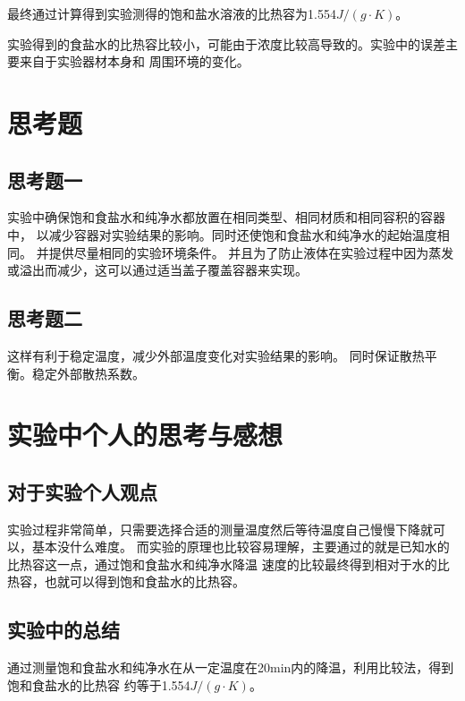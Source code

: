 \documentclass{ctexart}
\begin{document}
最终通过计算得到实验测得的饱和盐水溶液的比热容为1.554$J / (g \cdot K)$。

实验得到的食盐水的比热容比较小，可能由于浓度比较高导致的。实验中的误差主要来自于实验器材本身和
周围环境的变化。


\section{思考题}
  \subsection{思考题一}
  实验中确保饱和食盐水和纯净水都放置在相同类型、相同材质和相同容积的容器中，
  以减少容器对实验结果的影响。同时还使饱和食盐水和纯净水的起始温度相同。
  并提供尽量相同的实验环境条件。
  并且为了防止液体在实验过程中因为蒸发或溢出而减少，这可以通过适当盖子覆盖容器来实现。

  \subsection{思考题二}
  这样有利于稳定温度，减少外部温度变化对实验结果的影响。
  同时保证散热平衡。稳定外部散热系数。

\section{实验中个人的思考与感想}
  \subsection{对于实验个人观点}
  实验过程非常简单，只需要选择合适的测量温度然后等待温度自己慢慢下降就可以，基本没什么难度。
  而实验的原理也比较容易理解，主要通过的就是已知水的比热容这一点，通过饱和食盐水和纯净水降温
  速度的比较最终得到相对于水的比热容，也就可以得到饱和食盐水的比热容。

  \subsection{实验中的总结}
  通过测量饱和食盐水和纯净水在从一定温度在20min内的降温，利用比较法，得到饱和食盐水的比热容
  约等于1.554$J / (g \cdot K)$。
\end{document}
